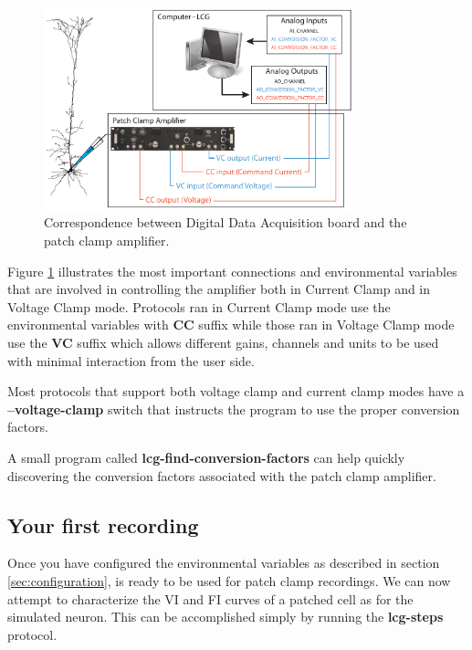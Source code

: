 \paragraph{}
\begin{figure}[h]
    \centering
    \includegraphics[width=0.8\textwidth]{figures/daq2amplifier}
    \caption{Correspondence between Digital Data Acquisition board and the patch clamp amplifier.}
    \label{fig:daq2amplifier}
\end{figure}

Figure \ref{fig:daq2amplifier} illustrates the most important connections and environmental variables that are involved in controlling the amplifier both in Current Clamp and in Voltage Clamp mode. Protocols ran in Current Clamp mode use the environmental variables with \textbf{CC} suffix while those ran in Voltage Clamp mode use the \textbf{VC} suffix which allows different gains, channels and units to be used with minimal interaction from the user side.
 
Most \progname protocols that support both voltage clamp and current clamp modes have a \textbf{--voltage-clamp} switch that instructs the program to use the proper conversion factors.

A small program called \textbf{lcg-find-conversion-factors} can help quickly discovering the conversion factors associated with the patch clamp amplifier.

\subsection{Your first recording}
Once you have configured the environmental variables as described in section \ref{sec:configuration}, \progname is ready to be used for patch clamp recordings.
 We can now attempt to characterize the VI and FI curves of a patched cell as for the simulated neuron. This can be accomplished simply by running the \textbf{lcg-steps} protocol. 


